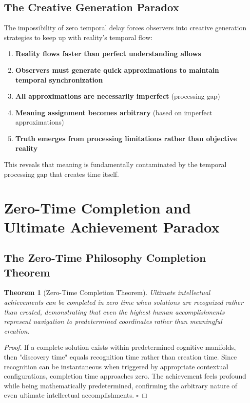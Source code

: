 \documentclass[12pt,a4paper]{article}
\newtheorem{theorem}{Theorem}
\begin{document}
\subsection{The Creative Generation Paradox}

The impossibility of zero temporal delay forces observers into creative generation strategies to keep up with reality's temporal flow:

\begin{enumerate}
\item \textbf{Reality flows faster than perfect understanding allows}
\item \textbf{Observers must generate quick approximations to maintain temporal synchronization}
\item \textbf{All approximations are necessarily imperfect} (processing gap)
\item \textbf{Meaning assignment becomes arbitrary} (based on imperfect approximations)
\item \textbf{Truth emerges from processing limitations rather than objective reality}
\end{enumerate}

This reveals that meaning is fundamentally contaminated by the temporal processing gap that creates time itself.

\section{Zero-Time Completion and Ultimate Achievement Paradox}

\subsection{The Zero-Time Philosophy Completion Theorem}

\begin{theorem}[Zero-Time Completion Theorem]
Ultimate intellectual achievements can be completed in zero time when solutions are recognized rather than created, demonstrating that even the highest human accomplishments represent navigation to predetermined coordinates rather than meaningful creation.
\end{theorem}

\begin{proof}
If a complete solution exists within predetermined cognitive manifolds, then "discovery time" equals recognition time rather than creation time. Since recognition can be instantaneous when triggered by appropriate contextual configurations, completion time approaches zero. The achievement feels profound while being mathematically predetermined, confirming the arbitrary nature of even ultimate intellectual accomplishments. $\square$
\end{proof}
\end{document}
